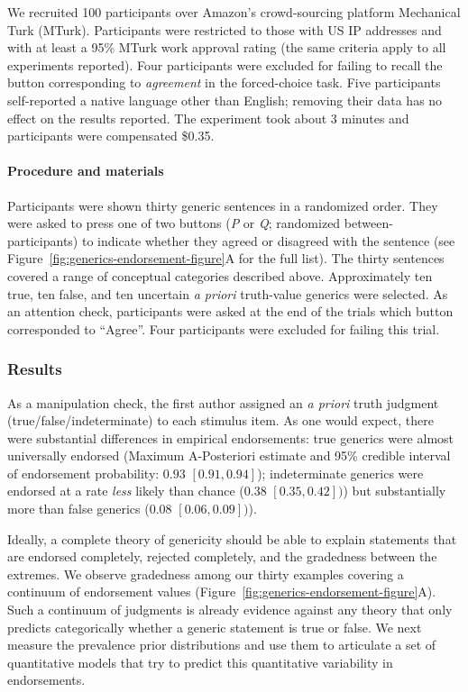 \documentclass[english,,man,floatsintext]{apa6}
\let\oldparagraph\paragraph
\renewcommand{\paragraph}[1]{\oldparagraph{#1}\mbox{}}
\theoremstyle{definition}
\theoremstyle{definition}
\theoremstyle{definition}
\theoremstyle{remark}
\begin{document}
We recruited 100 participants over Amazon's crowd-sourcing platform
Mechanical Turk (MTurk). Participants were restricted to those with US
IP addresses and with at least a 95\% MTurk work approval rating (the
same criteria apply to all experiments reported). Four participants were
excluded for failing to recall the button corresponding to
\emph{agreement} in the forced-choice task. Five participants
self-reported a native language other than English; removing their data
has no effect on the results reported. The experiment took about 3
minutes and participants were compensated \$0.35.

\hypertarget{procedure-and-materials}{%
\paragraph{Procedure and materials}\label{procedure-and-materials}}

Participants were shown thirty generic sentences in a randomized order.
They were asked to press one of two buttons (\emph{P} or \emph{Q};
randomized between-participants) to indicate whether they agreed or
disagreed with the sentence (see
Figure~\ref{fig:generics-endorsement-figure}A for the full list). The
thirty sentences covered a range of conceptual categories described
above. Approximately ten true, ten false, and ten uncertain \emph{a
priori} truth-value generics were selected. As an attention check,
participants were asked at the end of the trials which button
corresponded to \enquote{Agree}. Four participants were excluded for
failing this trial.

\hypertarget{results}{%
\subsubsection{Results}\label{results}}

As a manipulation check, the first author assigned an \emph{a priori}
truth judgment (true/false/indeterminate) to each stimulus item. As one
would expect, there were substantial differences in empirical
endorsements: true generics were almost universally endorsed (Maximum
A-Posteriori estimate and 95\% credible interval of endorsement
probability: \(0.93\) \([0.91, 0.94]\)); indeterminate generics were
endorsed at a rate \emph{less} likely than chance (\(0.38\)
\([0.35, 0.42])\)) but substantially more than false generics (\(0.08\)
\([0.06, 0.09])\)).

Ideally, a complete theory of genericity should be able to explain
statements that are endorsed completely, rejected completely, and the
gradedness between the extremes. We observe gradedness among our thirty
examples covering a continuum of endorsement values
(Figure~\ref{fig:generics-endorsement-figure}A). Such a continuum of
judgments is already evidence against any theory that only predicts
categorically whether a generic statement is true or false. We next
measure the prevalence prior distributions and use them to articulate a
set of quantitative models that try to predict this quantitative
variability in endorsements.
\end{document}
